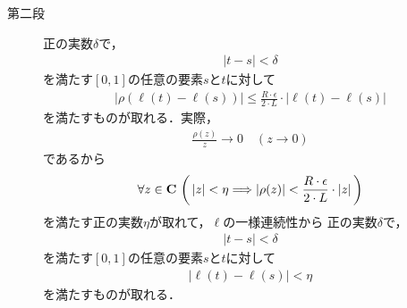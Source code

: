 \begin{sketch}
\begin{description}
			\item[第二段]
				正の実数$\delta$で，
				\begin{align}
					|t - s| < \delta
				\end{align}
				を満たす$[0,1]$の任意の要素$s$と$t$に対して
				\begin{align}
					\left|\rho(\ell(t) - \ell(s))\right| \leq \frac{R \cdot \epsilon}{2 \cdot L} \cdot |\ell(t) - \ell(s)| 
				\end{align}
				を満たすものが取れる．実際，
				\begin{align}
					\frac{\rho(z)}{z} \longrightarrow 0 \quad (z \longrightarrow 0)
				\end{align}
				であるから
				\begin{align}
					\forall z \in \mathbf{C}\,
					\left(\, |z| < \eta \Longrightarrow |\rho(z)| < \frac{R \cdot \epsilon}{2 \cdot L} \cdot |z|\, \right)
				\end{align}
				を満たす正の実数$\eta$が取れて，$\ell$の一様連続性から
				正の実数$\delta$で，
				\begin{align}
					|t - s| < \delta
				\end{align}
				を満たす$[0,1]$の任意の要素$s$と$t$に対して
				\begin{align}
					|\ell(t) - \ell(s)| < \eta
				\end{align}
				を満たすものが取れる．
				

\end{description}
\end{sketch}
